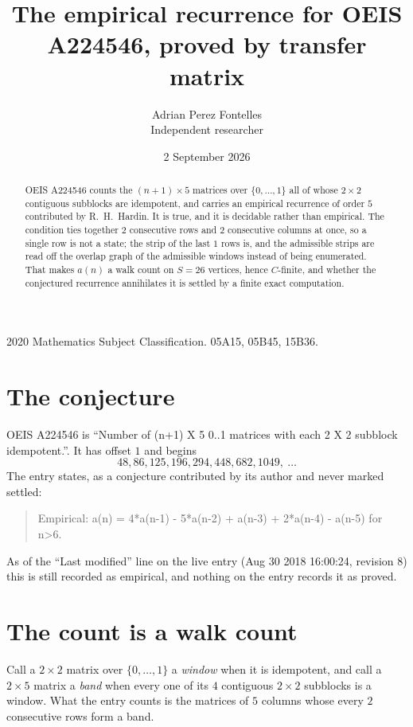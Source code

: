 \documentclass[11pt,a4paper]{article}
\title{The empirical recurrence for OEIS A224546, proved by transfer matrix}
\author{Adrian Perez Fontelles\\ \small Independent researcher}
\date{2 September 2026}
\theoremstyle{plain}
\theoremstyle{definition}
\begin{document}
\maketitle

\begin{abstract}
OEIS A224546 counts the $(n+1)\times5$ matrices over $\{0,\dots,1\}$ all of whose
$2\times2$ contiguous subblocks are idempotent, and carries an empirical recurrence of order
$5$ contributed by R.~H.~Hardin. It is true, and it is decidable rather than empirical.
The condition ties together $2$ consecutive rows and $2$ consecutive columns at once, so a
single row is not a state; the strip of the last $1$ rows is, and the admissible strips
are read off the overlap graph of the admissible windows instead of being enumerated. That
makes $a(n)$ a walk count on $S=26$ vertices, hence $C$-finite, and whether the conjectured
recurrence annihilates it is settled by a finite exact computation.
\end{abstract}

\noindent\small 2020 Mathematics Subject Classification. 05A15, 05B45, 15B36.\normalsize

\section{The conjecture}

OEIS A224546 is ``Number of (n+1) X 5 0..1 matrices with each 2 X 2 subblock idempotent.''. It has offset $1$ and begins
\[
48, 86, 125, 196, 294, 448, 682, 1049,\ \dots
\]
The entry states, as a conjecture contributed by its author and never marked settled:
\begin{quote}
Empirical: a(n) = 4*a(n-1) - 5*a(n-2) + a(n-3) + 2*a(n-4) - a(n-5) for n>6.
\end{quote}
As of the ``Last modified'' line on the live entry (Aug 30 2018 16:00:24, revision 8) this is still
recorded as empirical, and nothing on the entry records it as proved.

\section{The count is a walk count}

Call a $2\times2$ matrix over $\{0,\dots,1\}$ a \emph{window} when it is idempotent, and
call a $2\times5$ matrix a \emph{band} when every one of its $4$ contiguous
$2\times2$ subblocks is a window. What the entry counts is the matrices of $5$ columns
whose every $2$ consecutive rows form a band.
\end{document}
